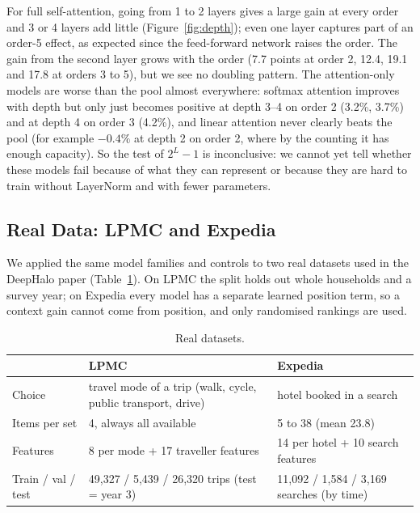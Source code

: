 \documentclass[11pt,a4paper]{article}
\numberwithin{table}{section}
\numberwithin{figure}{section}
\numberwithin{equation}{section}
\begin{document}
For full self-attention, going from 1 to 2 layers gives a large gain at every order and 3 or 4 layers add little (Figure~\ref{fig:depth}); even one layer captures part of an order-5 effect, as expected since the feed-forward network raises the order. The gain from the second layer grows with the order (7.7 points at order 2, 12.4, 19.1 and 17.8 at orders 3 to 5), but we see no doubling pattern. The attention-only models are worse than the pool almost everywhere: softmax attention improves with depth but only just becomes positive at depth 3--4 on order 2 (3.2\%, 3.7\%) and at depth 4 on order 3 (4.2\%), and linear attention never clearly beats the pool (for example $-0.4\%$ at depth 2 on order 2, where by the counting it has enough capacity). So the test of $2^L-1$ is inconclusive: we cannot yet tell whether these models fail because of what they can represent or because they are hard to train without LayerNorm and with fewer parameters.

\subsection{Real Data: LPMC and Expedia}\label{sec:real}
We applied the same model families and controls to two real datasets used in the DeepHalo paper (Table~\ref{tab:realdata}). On LPMC the split holds out whole households and a survey year; on Expedia every model has a separate learned position term, so a context gain cannot come from position, and only randomised rankings are used.

\begin{table}[h]
\centering\small
\caption{Real datasets.}\label{tab:realdata}
\begin{tabularx}{\textwidth}{@{}lXX@{}}
\toprule
& LPMC & Expedia\\
\midrule
Choice & travel mode of a trip (walk, cycle, public transport, drive) & hotel booked in a search\\
Items per set & 4, always all available & 5 to 38 (mean 23.8)\\
Features & 8 per mode + 17 traveller features & 14 per hotel + 10 search features\\
Train / val / test & 49,327 / 5,439 / 26,320 trips (test = year 3) & 11,092 / 1,584 / 3,169 searches (by time)\\
\bottomrule
\end{tabularx}
\end{table}
\end{document}
